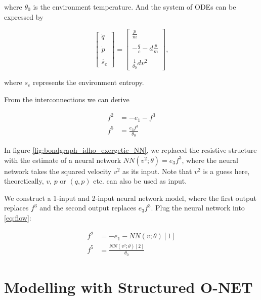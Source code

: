 \documentclass[
	parskip, 			   %
	twoside, 			   %
	DIV=14, 			   %
	BCOR=15.0mm, 		   %
	headsepline, 		   %
	open=right, 		   %
	captions=tableheading, %
	bibliography=totoc,    %
	numbers=noenddot       %
]{scrreprt}
\begin{document}
where $\theta_0$ is the environment temperature. And the system of ODEs can be expressed by

\begin{equation}
    \label{eq:ODE_idho_EPHS}
    \begin{bmatrix}
    \dot{q}\\\\
    \dot{p}\\\\
    \dot{s_e}
    \end{bmatrix}
    =
    \begin{bmatrix}
    \frac{p}{m}\\\\
    -\frac{q}{c}-d\frac{p}{m}\\\\
    \frac{1}{\theta_0} d v^2
    \end{bmatrix},
\end{equation}

where $s_e$ represents the environment entropy.

From the interconnections we can derive 

\begin{equation}
    \label{eq:flow}
    \begin{aligned}
    f^2 &= -e_1 - f^3\\
    f^5 &= \frac{e_3 f^3}{\theta_0}
    \end{aligned}
\end{equation}

In figure \ref{fig:bondgraph_idho_exergetic_NN}, we replaced the resistive structure with the estimate of a neural network $ NN(v^2; \theta ) = e_3 f^3$, where the neural network takes the squared velocity $v^2$ as its input. Note that $v^2$ is a guess here, theoretically, $v$, $p$ or $(q, p)$ etc. can also be used as input. 

We construct a 1-input and 2-input neural network model, where the first output replaces $f^3$ and the second output replaces $e_3 f^3$. Plug the neural network into \ref{eq:flow}:

\begin{equation}
    \label{eq:flow_with_NN}
    \begin{aligned}
    f^2 &= -e_1 - NN(v;\theta)[1]\\
    f^5 &= \frac{NN(v^2;\theta)[2]}{\theta_0}
    \end{aligned}
\end{equation}

\section{Modelling with Structured O-NET}
\end{document}
